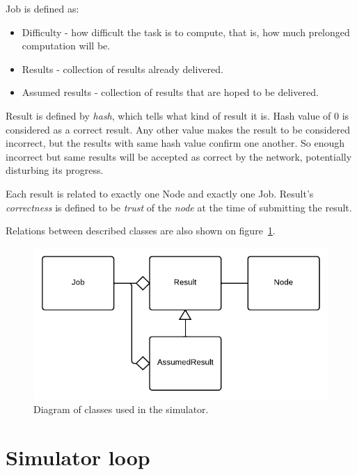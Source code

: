 Job is defined as:
\begin{itemize}
\item Difficulty - how difficult the task is to compute, that is, how much prelonged computation will be.
\item Results - collection of results already delivered.
\item Assumed results - collection of results that are hoped to be delivered.
\end{itemize}

Result is defined by \emph{hash}, which tells what kind of result it is. Hash value of 0 is considered as a correct result. Any other value makes the result to be considered incorrect, but the results with same hash value confirm one another. So enough incorrect but same results will be accepted as correct by the network, potentially disturbing its progress.

Each result is related to exactly one Node and exactly one Job. Result's \emph{correctness} is defined to be \emph{trust} of the \emph{node} at the time of submitting the result.

Relations between described classes are also shown on figure~\ref{f:simclassdg}.

\begin{figure}
\centering
\includegraphics{diagrams/SimulatorClassDiagram.pdf}
\caption{Diagram of classes used in the simulator.}
\label{f:simclassdg}
\end{figure}

\section{Simulator loop}

